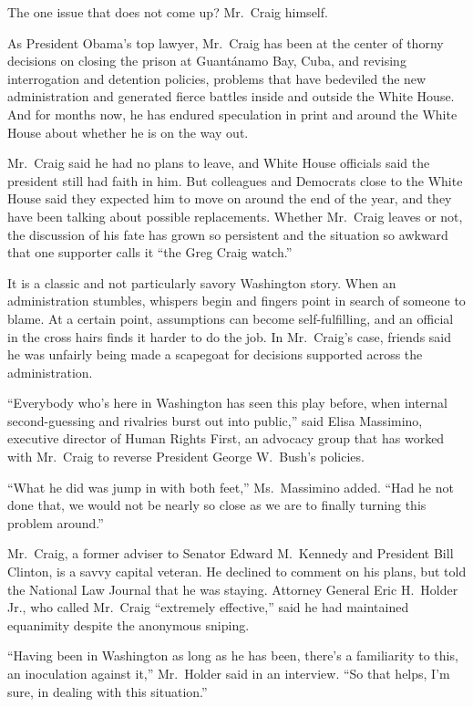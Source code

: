 ﻿\documentclass[12pt]{article}
\begin{document}
The one issue that does not come up? Mr.~Craig himself.

As President Obama's top lawyer, Mr.~Craig has been at the center of thorny decisions on closing the
prison at Guant\'anamo Bay, Cuba, and revising interrogation and detention policies, problems that
have bedeviled\cite{bedevil} the new administration and generated fierce battles inside and outside
the White House. And for months now, he has endured speculation in print and around the White House
about whether he is on the way out.

Mr.~Craig said he had no plans to leave, and White House officials said the president still had
faith in him. But colleagues and Democrats close to the White House said they expected him to move
on around the end of the year, and they have been talking about possible replacements. Whether
Mr.~Craig leaves or not, the discussion of his fate has grown so persistent and the situation so
awkward that one supporter calls it ``the Greg Craig watch.''

It is a classic and not particularly savory\cite{savory} Washington story. When an administration
stumbles, whispers begin and fingers point in search of someone to blame. At a certain point,
assumptions can become self-fulfilling, and an official in the cross hairs finds it harder to do the
job. In Mr.~Craig's case, friends said he was unfairly being made a scapegoat for decisions
supported across the administration.

``Everybody who's here in Washington has seen this play before, when internal second-guessing and
rivalries burst out into public,'' said Elisa Massimino, executive director of Human Rights First,
an advocacy group that has worked with Mr.~Craig to reverse President George W.~Bush's policies.

``What he did was jump in with both feet,'' Ms.~Massimino added. ``Had he not done that, we would
not be nearly so close as we are to finally turning this problem around.''

Mr.~Craig, a former adviser to Senator Edward M.~Kennedy and President Bill Clinton, is a savvy
capital veteran. He declined to comment on his plans, but told the National Law Journal that he was
staying. Attorney General Eric H.~Holder Jr., who called Mr.~Craig ``extremely effective,'' said he
had maintained equanimity despite the anonymous sniping.

``Having been in Washington as long as he has been, there's a familiarity to this, an inoculation
against it,'' Mr.~Holder said in an interview. ``So that helps, I'm sure, in dealing with this
situation.''
\end{document}
